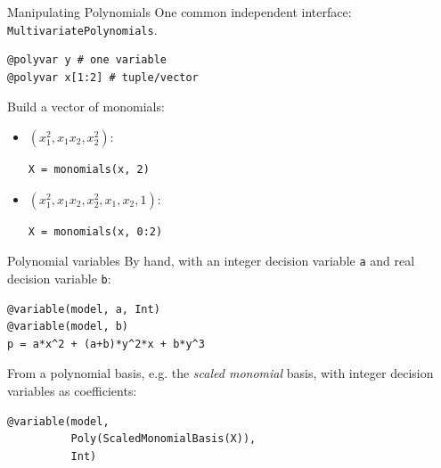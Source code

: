 \documentclass[final]{beamer}
\newlength{\onecolwid}
\begin{document}
\begin{frame}[t,fragile]
\begin{columns}[t]
\begin{column}{\onecolwid}
\begin{block}{Manipulating Polynomials}
    One common independent interface: \texttt{MultivariatePolynomials}.
\begin{verbatim}
@polyvar y # one variable
@polyvar x[1:2] # tuple/vector
\end{verbatim}
    Build a vector of monomials:

    \begin{itemize}
      \item
        $(x_1^2, x_1x_2, x_2^2)$:
\begin{verbatim}
X = monomials(x, 2)
\end{verbatim}
      \item
        $(x_1^2, x_1x_2, x_2^2, x_1, x_2, 1)$:
\begin{verbatim}
X = monomials(x, 0:2)
\end{verbatim}
    \end{itemize}
  \end{block}

  \begin{block}{Polynomial variables}
    By hand, with an integer decision variable \texttt{a} and real decision variable \texttt{b}:
\begin{verbatim}
@variable(model, a, Int)
@variable(model, b)
p = a*x^2 + (a+b)*y^2*x + b*y^3
\end{verbatim}
    From a polynomial basis, e.g. the
    \emph{scaled monomial} basis,
    with integer decision variables as coefficients:
\begin{verbatim}
@variable(model,
          Poly(ScaledMonomialBasis(X)),
          Int)
\end{verbatim}
  \end{block}


\end{column}
\end{columns}
\end{frame}
\end{document}
